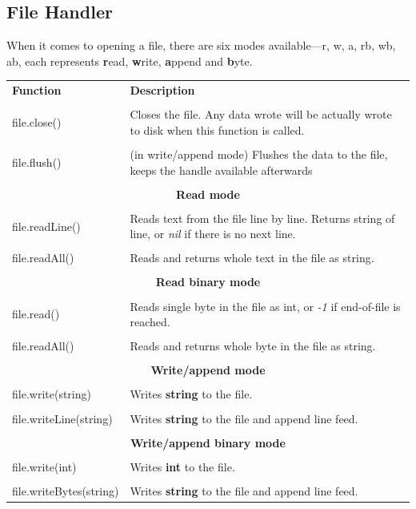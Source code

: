 \documentclass[10pt, stock]{memoir}
\begin{document}
\subsection{File Handler}

When it comes to opening a file, there are six modes available---r, w, a, rb, wb, ab, each represents \textbf{r}ead, \textbf{w}rite, \textbf{a}ppend and \textbf{b}yte.

\begin{tabularx}{\textwidth}{l X}
	\textbf{\large Function} & \textbf{\large Description}
	\\ \\
	\endhead
	file.close() & Closes the file. Any data wrote will be actually wrote to disk when this function is called.
	\\ \\
	file.flush() & (in write/append mode) Flushes the data to the file, keeps the handle available afterwards
	\\ \\
	\multicolumn{2}{c}{\textbf{Read mode}}
	\\ \\ 
	file.readLine() & Reads text from the file line by line. Returns string of line, or \emph{nil} if there is no next line.
	\\ \\
	file.readAll() & Reads and returns whole text in the file as string.
	\\ \\
	\multicolumn{2}{c}{\textbf{Read binary mode}}
	\\ \\
	file.read() & Reads single byte in the file as int, or \emph{-1} if end-of-file is reached.
	\\ \\
	file.readAll() & Reads and returns whole byte in the file as string.
	\\ \\
	\multicolumn{2}{c}{\textbf{Write/append mode}}
	\\ \\
	file.write(string) & Writes \textbf{string} to the file.
	\\ \\
	file.writeLine(string) & Writes \textbf{string} to the file and append line feed.
	\\ \\
	\multicolumn{2}{c}{\textbf{Write/append binary mode}}
	\\ \\
	file.write(int) & Writes \textbf{int} to the file.
	\\ \\
	file.writeBytes(string) & Writes \textbf{string} to the file and append line feed.
\end{tabularx}
\end{document}
